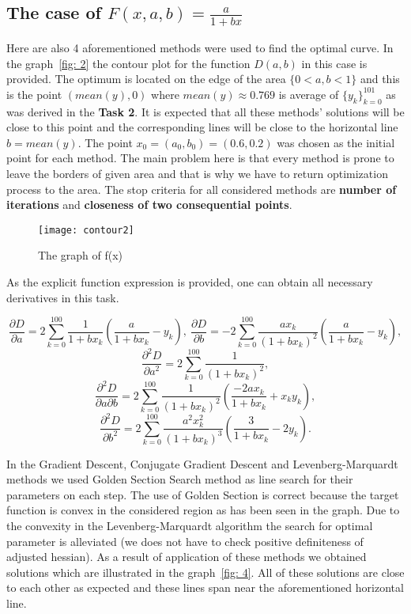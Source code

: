 \documentclass[12pt, bachelor, substylefile = algo_title.rtx]{disser}
\theoremstyle{definition}
\begin{document}
\subsection{The case of $F(x, a, b) = \frac{a}{1+bx}$}
Here are also 4 aforementioned methods were used to find the optimal curve. In the graph~\ref{fig: 2} the contour plot for the function $D(a,b)$ in this case is provided. The optimum is located on the edge of the area $\{0<a,b<1\}$ and this is the point $(mean(y), 0)$ where $mean(y) \approx 0.769$ is average of $\{y_k\}_{k=0}^{101}$ as was derived in the \textbf{Task 2}. It is expected that all these methods' solutions will be close to this point and the corresponding lines will be close to the horizontal line $b = mean(y)$. The point $x_0 = (a_0, b_0)=(0.6, 0.2)$ was chosen as the initial point for each method. The main problem here is that every method is prone to leave the borders of given area and that is why we have to return optimization process to the area. The stop criteria for all considered methods are \textbf{number of iterations} and \textbf{closeness of two consequential points}.

\begin{figure}[h]
\begin{center}
\texttt{[image: contour2]}
\caption{The graph of f(x)}
\label{fig: 3}
\end{center}
\end{figure}

As the explicit function expression is provided, one can obtain all necessary derivatives in this task.

$$ \frac{\partial D}{\partial a} = 2 \sum_{k=0}^{100}\frac{1}{1+bx_k}\left(\frac{a}{1+bx_k}-y_k\right),\ \frac{\partial D}{\partial b} = -2\sum_{k=0}^{100} \frac{ax_k}{(1+bx_k)^2}\left(\frac{a}{1+bx_k}-y_k\right), $$
$$ \frac{\partial^2 D}{\partial a^2} = 2\sum_{k=0}^{100} \frac{1}{(1+bx_k)^2},$$ $$ \frac{\partial^2 D}{\partial a \partial b} = 2\sum_{k=0}^{100} \frac{1}{(1+bx_k)^2} \left( \frac{-2ax_k}{1+bx_k} + x_ky_k \right),$$ $$ \frac{\partial^2 D}{\partial b^2} = 2\sum_{k=0}^{100} \frac{a^2x^2_k}{(1+bx_k)^3} \left( \frac{3}{1+bx_k} - 2y_k \right). $$

In the Gradient Descent, Conjugate Gradient Descent and Levenberg-Marquardt methods we used Golden Section Search method as line search for their parameters on each step. The use of Golden Section is correct because the target function is convex in the considered region as has been seen in the graph. Due to the convexity in the Levenberg-Marquardt algorithm the search for optimal parameter is alleviated (we does not have to check positive definiteness of adjusted hessian). As a result of application of these methods we obtained solutions which are illustrated in the graph~\ref{fig: 4}. All of these solutions are close to each other as expected and these lines span near the aforementioned horizontal line.
\end{document}
